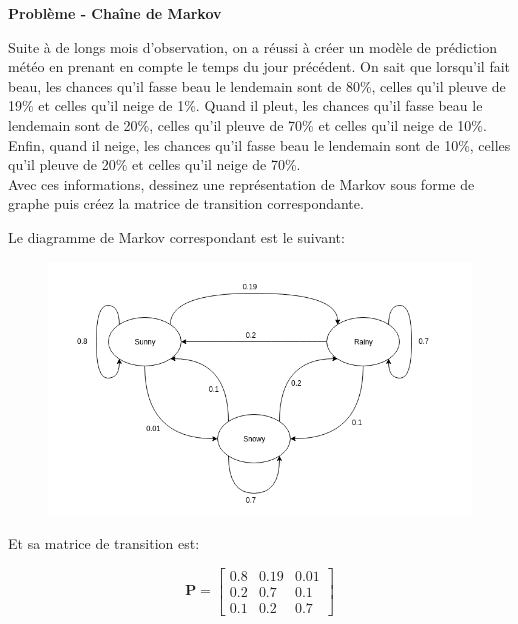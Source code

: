\begin{Exercice}[10 minutes]\textbf{Problème - Chaîne de Markov}

Suite à  de longs mois d’observation, on a réussi à créer un modèle de prédiction météo en prenant en compte le temps du jour précédent. On sait que lorsqu’il fait beau, les chances qu’il fasse beau le lendemain sont de 80\%, celles qu’il pleuve de 19\% et celles qu’il neige de 1\%. Quand il pleut, les chances qu’il fasse beau le lendemain sont de 20\%, celles qu’il pleuve de 70\% et celles qu’il neige de 10\%. Enfin, quand il neige, les chances qu’il fasse beau le lendemain sont de 10\%, celles qu’il pleuve de 20\% et celles qu’il neige de 70\%.\\
Avec ces informations, dessinez une représentation de Markov sous forme de graphe puis créez la matrice de transition correspondante.


    \begin{solution}
        Le diagramme de Markov correspondant est le suivant:

	\begin{figure}[h!]
	    \centering
	    \includegraphics[width=.7\textwidth]{Etats_markov.png}

	\end{figure}
	
	Et sa matrice de transition est:

	\[ 
		\mathbf{P} =
		\begin{bmatrix}
		0.8 & 0.19 & 0.01 \\
		0.2 & 0.7 & 0.1 \\
		0.1 & 0.2 & 0.7
		\end{bmatrix}
	\]
	
    \end{solution}


\end{Exercice}


